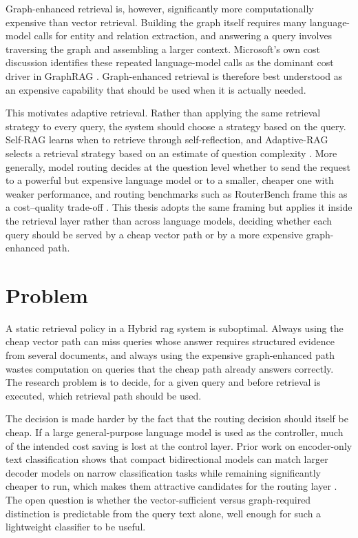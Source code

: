 \documentclass[english, bibtex]{kththesis}               %
\numberwithin{listing}{chapter}
\begin{document}
Graph-enhanced retrieval is, however, significantly more computationally expensive than vector retrieval. Building the graph itself requires many language-model calls for entity and relation extraction, and answering a query involves traversing the graph and assembling a larger context. Microsoft's own cost discussion identifies these repeated language-model calls as the dominant cost driver in GraphRAG \cite{edge2024graphrag,microsoft2024graphragcosts}. Graph-enhanced retrieval is therefore best understood as an expensive capability that should be used when it is actually needed.

This motivates adaptive retrieval. Rather than applying the same retrieval strategy to every query, the system should choose a strategy based on the query. Self-RAG learns when to retrieve through self-reflection, and Adaptive-RAG selects a retrieval strategy based on an estimate of question complexity \cite{asai2023selfrag,jeong2024adaptiverag}. More generally, model routing decides at the question level whether to send the request to a powerful but expensive language model or to a smaller, cheaper one with weaker performance, and routing benchmarks such as RouterBench frame this as a cost--quality trade-off \cite{hu2024routerbench}. This thesis adopts the same framing but applies it inside the retrieval layer rather than across language models, deciding whether each query should be served by a cheap vector path or by a more expensive graph-enhanced path.

\section{Problem}
\label{sec:problem}

A static retrieval policy in a Hybrid \gls{rag} system is suboptimal. Always using the cheap vector path can miss queries whose answer requires structured evidence from several documents, and always using the expensive graph-enhanced path wastes computation on queries that the cheap path already answers correctly. The research problem is to decide, for a given query and before retrieval is executed, which retrieval path should be used.

The decision is made harder by the fact that the routing decision should itself be cheap. If a large general-purpose language model is used as the controller, much of the intended cost saving is lost at the control layer. Prior work on encoder-only text classification shows that compact bidirectional models can match larger decoder models on narrow classification tasks while remaining significantly cheaper to run, which makes them attractive candidates for the routing layer \cite{benayas2024encoder}. The open question is whether the vector-sufficient versus graph-required distinction is predictable from the query text alone, well enough for such a lightweight classifier to be useful.
\end{document}

